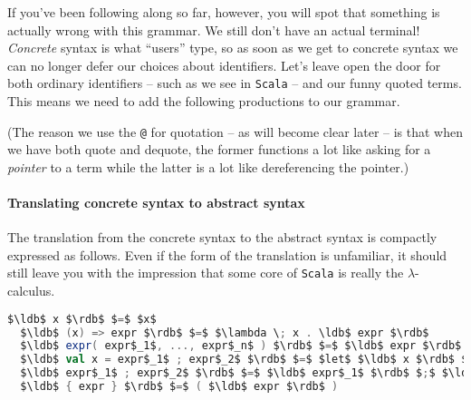 If you've been following along so far, however, you will spot that
something is actually wrong with this grammar. We still don't have an
actual terminal! \emph{Concrete} syntax is what ``users'' type, so as
soon as we get to concrete syntax we can no longer defer our choices
about identifiers. Let's leave open the door for both ordinary
identifiers -- such as we see in \texttt{Scala} -- and our funny
quoted terms. This means we need to add the following productions to
our grammar.


(The reason we use the \texttt{@} for quotation -- as will become
clear later -- is that when we have both quote and dequote, the former
functions a lot like asking for a \emph{pointer} to a term while the
latter is a lot like dereferencing the pointer.)

\paragraph{Translating concrete syntax to abstract syntax}
The translation from the concrete syntax to the abstract syntax is
compactly expressed as follows. Even if the form of the translation is
unfamiliar, it should still leave you with the impression that some
core of \texttt{Scala} is really the $\lambda$-calculus.


\begin{lstlisting}[language=Scala,mathescape=true]
  $\ldb$ x $\rdb$ $=$ $x$
  $\ldb$ (x) => expr $\rdb$ $=$ $\lambda \; x . \ldb$ expr $\rdb$ 
  $\ldb$ expr( expr$_1$, ..., expr$_n$ ) $\rdb$ $=$ $\ldb$ expr $\rdb$ $\ldb$ expr$_1$ $\rdb$ ... $\ldb$ expr$n$ $\rdb$
  $\ldb$ val x = expr$_1$ ; expr$_2$ $\rdb$ $=$ $let$ $\ldb$ x $\rdb$ $=$ $\ldb$ expr$_1$ $\rdb$ $in$ $\ldb$ expr$_2$ $\rdb$
  $\ldb$ expr$_1$ ; expr$_2$ $\rdb$ $=$ $\ldb$ expr$_1$ $\rdb$ $;$ $\ldb$ expr$_2$ $\rdb$
  $\ldb$ { expr } $\rdb$ $=$ ( $\ldb$ expr $\rdb$ )
\end{lstlisting}

